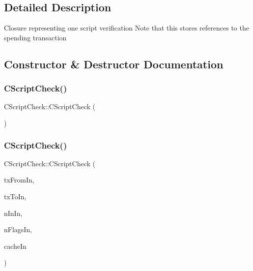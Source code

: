 \subsection{Detailed Description}
Closure representing one script verification Note that this stores references to the spending transaction 

\subsection{Constructor \& Destructor Documentation}
\mbox{\label{class_c_script_check_a4a3bf9c971437bcb6fae3e3254a8c178}} 
\subsubsection{\texorpdfstring{C\+Script\+Check()}{CScriptCheck()}\hspace{0.1cm}{\footnotesize\ttfamily [1/2]}}
{\footnotesize\ttfamily C\+Script\+Check\+::\+C\+Script\+Check (\begin{DoxyParamCaption}{ }\end{DoxyParamCaption})\hspace{0.3cm}{\ttfamily [inline]}}

\mbox{\label{class_c_script_check_a2617b99b66cd1de327478b74d8441c76}} 
\subsubsection{\texorpdfstring{C\+Script\+Check()}{CScriptCheck()}\hspace{0.1cm}{\footnotesize\ttfamily [2/2]}}
{\footnotesize\ttfamily C\+Script\+Check\+::\+C\+Script\+Check (\begin{DoxyParamCaption}\item[{const \mbox{\hyperlink{class_c_coins}{C\+Coins}} \&}]{tx\+From\+In,  }\item[{const C\+Transaction \&}]{tx\+To\+In,  }\item[{unsigned int}]{n\+In\+In,  }\item[{unsigned int}]{n\+Flags\+In,  }\item[{bool}]{cache\+In }\end{DoxyParamCaption})\hspace{0.3cm}{\ttfamily [inline]}}



